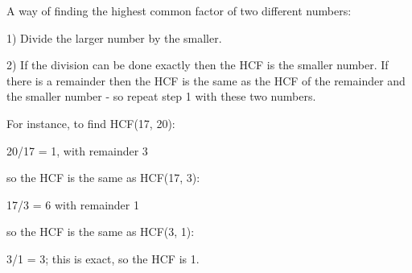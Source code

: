 A way of finding the highest common factor of 
two different numbers:
\par
1) Divide the larger number by the smaller. 
\par
2) If the division can be done exactly then the 
HCF is the smaller number. If there is a remainder
then the HCF is the same as the HCF of the remainder
and the smaller number - so repeat step 1 with 
these two numbers.
\par
For instance, to find HCF(17, 20):
\par
20/17 = 1, with remainder 3
\par
so the HCF is the same as HCF(17, 3):
\par
17/3 = 6 with remainder 1
\par
so the HCF is the same as HCF(3, 1):
\par
3/1 = 3; this is exact, so the HCF is 1.